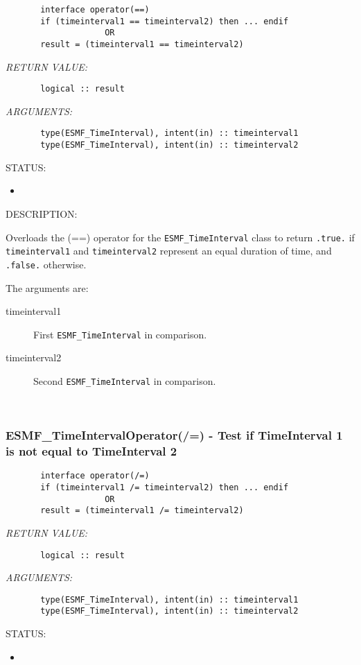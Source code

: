   
\begin{verbatim}       interface operator(==)
       if (timeinterval1 == timeinterval2) then ... endif
                    OR
       result = (timeinterval1 == timeinterval2)\end{verbatim}{\em RETURN VALUE:}
\begin{verbatim}       logical :: result\end{verbatim}{\em ARGUMENTS:}
\begin{verbatim}       type(ESMF_TimeInterval), intent(in) :: timeinterval1
       type(ESMF_TimeInterval), intent(in) :: timeinterval2\end{verbatim}
{\sf STATUS:}
   \begin{itemize}
   \item{}
   \end{itemize}
  
{\sf DESCRIPTION:\\ }


       Overloads the (==) operator for the {\tt ESMF\_TimeInterval} class to
       return {\tt .true.} if {\tt timeinterval1} and {\tt timeinterval2} 
       represent an equal duration of time, and {\tt .false.} otherwise.
  
       The arguments are:
       \begin{description}
       \item[timeinterval1]
            First {\tt ESMF\_TimeInterval} in comparison.
       \item[timeinterval2]
            Second {\tt ESMF\_TimeInterval} in comparison.
       \end{description}
    
 
\mbox{}\hrulefill\ 
 
\subsubsection [ESMF\_TimeIntervalOperator(/=)] {ESMF\_TimeIntervalOperator(/=) - Test if TimeInterval 1 is not equal to TimeInterval 2}


  
\begin{verbatim}       interface operator(/=)
       if (timeinterval1 /= timeinterval2) then ... endif
                    OR
       result = (timeinterval1 /= timeinterval2)\end{verbatim}{\em RETURN VALUE:}
\begin{verbatim}       logical :: result\end{verbatim}{\em ARGUMENTS:}
\begin{verbatim}       type(ESMF_TimeInterval), intent(in) :: timeinterval1
       type(ESMF_TimeInterval), intent(in) :: timeinterval2\end{verbatim}
{\sf STATUS:}
   \begin{itemize}
   \item{}
   \end{itemize}
  
